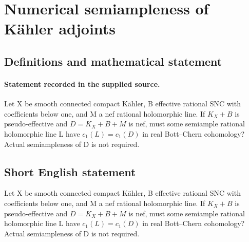 \documentclass[11pt]{article}
\begin{document}
\section*{Numerical semiampleness of Kähler adjoints}\label{30007040}
\subsection{Definitions and mathematical statement}
\paragraph{Statement recorded in the supplied source.}
Let X be smooth connected compact Kähler, B effective rational SNC with coefficients below one, and M a nef rational holomorphic line. If $K_X+B$ is pseudo-effective and $D=K_X+B+M$ is nef, must some semiample rational holomorphic line L have $c_{1}(L)=c_{1}(D)$ in real Bott–Chern cohomology? Actual semiampleness of D is not required.
\subsection{Short English statement}
Let X be smooth connected compact Kähler, B effective rational SNC with coefficients below one, and M a nef rational holomorphic line. If $K_X+B$ is pseudo-effective and $D=K_X+B+M$ is nef, must some semiample rational holomorphic line L have $c_{1}(L)=c_{1}(D)$ in real Bott–Chern cohomology? Actual semiampleness of D is not required.
\end{document}
